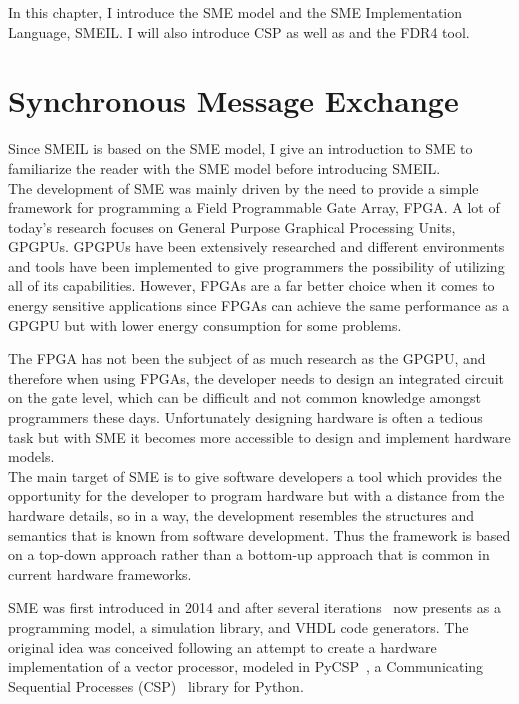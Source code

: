 In this chapter, I introduce the SME model and the SME Implementation Language, SMEIL. I will also introduce CSP as well as \cspm{} and the FDR4 tool.

\section{Synchronous Message Exchange}
Since SMEIL is based on the SME model, I give an introduction to SME to familiarize the reader with the SME model before introducing SMEIL.
\\

The development of SME was mainly driven by the need to provide a simple framework for programming a Field Programmable Gate
Array, FPGA. A lot of today's research focuses on General Purpose Graphical Processing Units, GPGPUs. GPGPUs have been extensively researched and different environments and tools have been implemented to give programmers the possibility of utilizing all of its capabilities. However, FPGAs are a far better choice when it comes to energy sensitive applications since FPGAs can achieve the same performance as a GPGPU but with lower energy consumption for some problems.

The FPGA has not been the subject of as much research as the GPGPU, and therefore when using FPGAs, the developer needs to design an integrated circuit on the gate level, which can be difficult and not common knowledge amongst programmers these days.
Unfortunately designing hardware is often a tedious task but with SME it becomes more accessible to design and implement hardware models.\\

The main target of SME is to give software developers a tool which provides the opportunity for the developer to program hardware but with a distance from the hardware details, so in a way, the development resembles the structures and semantics that is known from software development.
Thus the framework is based on a top-down approach rather than a bottom-up approach that is common in current hardware frameworks.

SME was first introduced in 2014 and after several iterations~\cite{Vinter2014, Vinter2015, Skovhede} now presents as a programming model, a simulation library, and VHDL code generators. The original idea was conceived following an attempt to create a hardware implementation of a vector processor, modeled in PyCSP~\cite{bjorndalen2007pycsp, vinter2009pycsp},
a Communicating Sequential Processes (CSP)~\cite{Hoare1978} library for Python.\\

